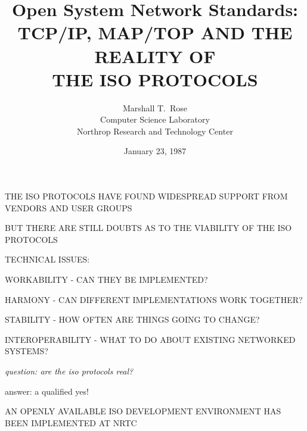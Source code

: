


\def\tradeORGfont{\rm}
\def\tradeNAMfont{\rm}

\raggedright



\title	{Open System Network Standards:\\
	TCP/IP, MAP/TOP AND THE REALITY OF\\ THE ISO PROTOCOLS}
\author	{Marshall T.~Rose\\
	Computer Science Laboratory\\
	Northrop Research and Technology Center}
\date	{January 23, 1987}
\maketitlepage


\begin{bwslide}

\begin{nrtc}
\item	THE ISO PROTOCOLS HAVE FOUND WIDESPREAD SUPPORT FROM
	VENDORS AND USER GROUPS

\item	BUT THERE ARE STILL DOUBTS AS TO THE VIABILITY OF THE ISO PROTOCOLS

\item	TECHNICAL ISSUES:
    \begin{nrtc}
    \item	WORKABILITY - CAN THEY BE IMPLEMENTED?
    \item	HARMONY - CAN DIFFERENT IMPLEMENTATIONS WORK TOGETHER?
    \item	STABILITY - HOW OFTEN ARE THINGS GOING TO CHANGE?
    \item	INTEROPERABILITY - WHAT TO DO ABOUT EXISTING NETWORKED
		SYSTEMS?
    \end{nrtc}
\end{nrtc}
\end{bwslide}


\begin{note}\em
question: are the iso protocols real?

answer: a qualified yes!
\end{note}


\begin{bwslide}

\begin{nrtc}
\item	AN OPENLY AVAILABLE ISO DEVELOPMENT ENVIRONMENT HAS BEEN IMPLEMENTED
	AT NRTC
\end{nrtc}
\end{bwslide}


